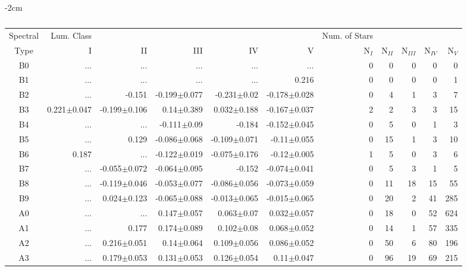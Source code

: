 \begin{table}[t]
\tiny
\centering
\caption{\jwtwo}
\begin{center}
    \addtolength{\leftskip} {-2cm}
    \addtolength{\rightskip}{-2cm}
    \begin{tabular}{c|rrrrr|rrrrr}
    \toprule
    Spectral & Lum. Class & & & & & Num. of Stars & & & &  \\
    Type & I & II & III &  IV & V & N$_{I}$ & N$_{II}$ & N$_{III}$ & N$_{IV}$ & N$_{V}$ \\ \midrule
      
    B0	&	 ...	&	 ...	&	 ...	&	 ...	&	 ...	&	0	&	0	&	0	&	0	&	0	\\
    B1	&	 ...	&	 ...	&	 ...	&	 ...	&	0.216	&	0	&	0	&	0	&	0	&	1	\\
    B2	&	 ...	&	-0.151	&	-0.199$\pm$0.077	&	-0.231$\pm$0.02	&	-0.178$\pm$0.028	&	0	&	4	&	1	&	3	&	7	\\
    B3	&	0.221$\pm$0.047	&	-0.199$\pm$0.106	&	0.14$\pm$0.389	&	0.032$\pm$0.188	&	-0.167$\pm$0.037	&	2	&	2	&	3	&	3	&	15	\\
    B4	&	 ...	&	 ...	&	-0.111$\pm$0.09	&	-0.184	&	-0.152$\pm$0.045	&	0	&	5	&	0	&	1	&	3	\\
    B5	&	 ...	&	0.129	&	-0.086$\pm$0.068	&	-0.109$\pm$0.071	&	-0.11$\pm$0.055	&	0	&	15	&	1	&	3	&	10	\\
    B6	&	0.187	&	 ...	&	-0.122$\pm$0.019	&	-0.075$\pm$0.176	&	-0.12$\pm$0.005	&	1	&	5	&	0	&	3	&	6	\\
    B7	&	 ...	&	-0.055$\pm$0.072	&	-0.064$\pm$0.095	&	-0.152	&	-0.074$\pm$0.041	&	0	&	5	&	3	&	1	&	5	\\
    B8	&	 ...	&	-0.119$\pm$0.046	&	-0.053$\pm$0.077	&	-0.086$\pm$0.056	&	-0.073$\pm$0.059	&	0	&	11	&	18	&	15	&	55	\\
    B9	&	 ...	&	0.024$\pm$0.123	&	-0.065$\pm$0.088	&	-0.013$\pm$0.065	&	-0.015$\pm$0.065	&	0	&	20	&	2	&	41	&	285	\\
    A0	&	 ...	&	 ...	&	0.147$\pm$0.057	&	0.063$\pm$0.07	&	0.032$\pm$0.057	&	0	&	18	&	0	&	52	&	624	\\
    A1	&	 ...	&	0.177	&	0.174$\pm$0.089	&	0.102$\pm$0.08	&	0.068$\pm$0.052	&	0	&	14	&	1	&	57	&	335	\\
    A2	&	 ...	&	0.216$\pm$0.051	&	0.14$\pm$0.064	&	0.109$\pm$0.056	&	0.086$\pm$0.052	&	0	&	50	&	6	&	80	&	196	\\
    A3	&	 ...	&	0.179$\pm$0.053	&	0.131$\pm$0.053	&	0.126$\pm$0.054	&	0.11$\pm$0.047	&	0	&	96	&	19	&	69	&	215	\\

\end{tabular}
\end{center}
\end{table}
